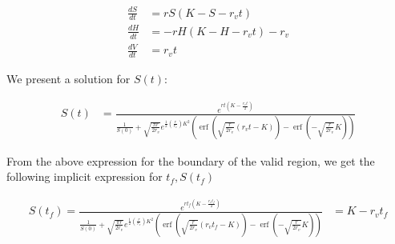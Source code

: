 \documentclass{article}
\DeclareMathOperator\erf{erf}
\begin{document}
\begin{align*}
\frac{dS}{dt} & = r S \left( K - S - r_v t \right)\\
\frac{dH}{dt} & = - r H \left( K - H - r_v t \right) - r_v \\
\frac{dV}{dt} & = r_v t
\end{align*}

We present a solution for $S(t)$:

\begin{align}
S(t) & = 
	\frac{e^{ r t (K - \frac{ r_v t}{2})}}
	{\frac{1}{S(0)} + \sqrt{\frac{\pi r}{2 r_v}}
		e^{\frac12 \left( \frac{r}{r_v} \right) K^2}
		\left(\erf\left(  \sqrt{\frac{r}{2 r_v}} (r_v t - K ) \right)
			- \erf\left( - \sqrt{\frac{r}{2 r_v}} K \right) \right)}
\end{align}

From the above expression for the boundary of the valid region,
	we get the following implicit expression for $t_f, S(t_f)$

\begin{align}
S(t_f) = 
	\frac{e^{ r t_f (K - \frac{ r_v t_f }{2})}}
	{\frac{1}{S(0)} + \sqrt{\frac{\pi r}{2 r_v}}
		e^{\frac12 \left( \frac{r}{r_v} \right) K^2}
		\left(\erf\left(  \sqrt{\frac{r}{2 r_v}} (r_v t_f - K ) \right)
			- \erf\left( - \sqrt{\frac{r}{2 r_v}} K \right) \right)}
	& = K - r_v t_f 
\end{align}
\end{document}
